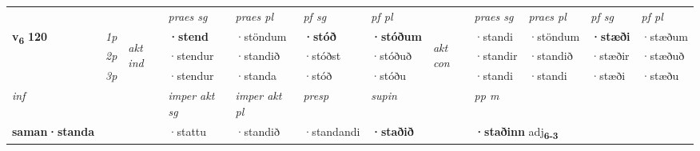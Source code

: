 \begin{longtable}[l]{X>{\footnotesize\itshape}llXXXXlXXXX}
\midrule

 & &   & \textit{praes sg}  & \textit{praes pl}    & \textit{ pf sg} & \textit{pf pl} & & \textit{praes sg}  & \textit{praes pl}    & \textit{pf sg} & \textit{pf pl }  \\ \cmidrule{4-7} \cmidrule{9-12}
 \multirow{2}{*}{{{\textbf{v{\textsubscript{6}}} \Large{\textbf{120}}}}}  & 1p & \multirow{3}{*}{\begin{turn}{90}\textit{akt ind}\end{turn}} & \textbf{·stend} & ·stöndum & \textbf{·stóð} & \textbf{·stóðum} & \multirow{3}{*}{\begin{turn}{90}\textit{akt con}\end{turn}} &·standi & ·stöndum & \textbf{·stæði} & ·stæðum\\*
 & 2p &  &  ·stendur  & ·standið & ·stóðst & ·stóðuð & & ·standir & ·standið & ·stæðir & ·stæðuð \\*
 & 3p &  & ·stendur & ·standa & ·stóð & ·stóðu & & ·standi & ·standi& ·stæði & ·stæðu \\*
\cmidrule{4-7} \cmidrule{9-12}

   {\textit{inf}} & &  & \textit{imper akt sg} & \textit{imper akt pl}   & \textit{presp} & \textit{supin}  && \textit{pp m} \\*
  {\textbf{saman\allowbreak ·standa}} & && ·stattu  & ·standið   & ·standandi &  \textbf{·staðið}  && \multicolumn{2}{l}{\textbf{·staðinn} adj\textbf{\textsubscript{6-3}}} \\*

\midrule


\end{longtable}
